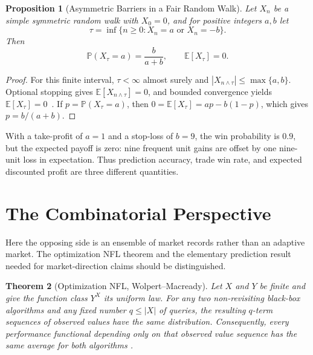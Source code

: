 \documentclass[aps,pra,reprint,superscriptaddress,amsmath,amssymb,floatfix]{revtex4-2}
\theoremstyle{plain}
\newtheorem{theorem}{Theorem}
\newtheorem{proposition}[theorem]{Proposition}
\theoremstyle{definition}
\theoremstyle{remark}
\begin{document}
\begin{proposition}[Asymmetric Barriers in a Fair Random Walk]
  \label{prop:optional}
  Let \(X_n\) be a simple symmetric random walk with \(X_0=0\), and for positive
  integers \(a,b\) let
  \[
    \tau=\inf\{n\geq0:X_n=a\text{ or }X_n=-b\}.
  \]
  Then
  \begin{equation}
    \mathbb{P}(X_\tau=a)=\frac{b}{a+b},
    \qquad
    \mathbb{E}[X_\tau]=0.
    \label{eq:gambler}
  \end{equation}
\end{proposition}

\begin{proof}
For this finite interval, \(\tau<\infty\) almost surely and
\(|X_{n\wedge\tau}|\leq\max\{a,b\}\). Optional stopping gives
\(\mathbb E[X_{n\wedge\tau}]=0\), and bounded convergence yields
\(\mathbb E[X_\tau]=0\)~\cite{Doob1953}. If
\(p=\mathbb{P}(X_\tau=a)\), then
\(0=\mathbb{E}[X_\tau]=ap-b(1-p)\), which gives
\(p=b/(a+b)\).
\end{proof}

With a take-profit of \(a=1\) and a stop-loss of \(b=9\), the win probability
is \(0.9\), but the expected payoff is zero: nine frequent unit gains are
offset by one nine-unit loss in expectation. Thus prediction accuracy, trade
win rate, and expected discounted profit are three different quantities.

\section{The Combinatorial Perspective}
\label{sec:nfl}

Here the opposing side is an ensemble of market records rather than an
adaptive market. The optimization NFL theorem and the elementary prediction
result needed for market-direction claims should be distinguished.

\begin{theorem}[Optimization NFL, Wolpert--Macready]
  \label{thm:nfl}
  Let \(X\) and \(Y\) be finite and give the function class \(Y^X\) its uniform
  law. For any two non-revisiting black-box algorithms and any fixed number
  \(q\leq |X|\) of queries, the resulting \(q\)-term sequences of observed
  values have the same distribution. Consequently, every performance
  functional depending only on that observed value sequence has the same
  average for both algorithms
  \cite{Wolpert:1997:NFL:2221336.2221408}.
\end{theorem}
\end{document}

